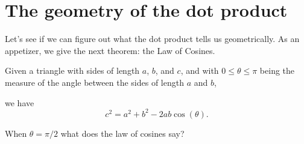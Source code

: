 \documentclass{ximera}
\begin{document}
\section{The geometry of the dot product}

Let's see if we can figure out what the dot product tells us geometrically. As
an appetizer, we give the next theorem: the Law of Cosines.

\begin{theorem}
  Given a triangle with sides of length $a$, $b$, and $c$, and with
  $0\le\theta\le\pi$ being the measure of the angle between the sides
  of length $a$ and $b$,
  \begin{image}
  \end{image}
  we have
  \[
  c^2 = a^2+b^2-2ab\cos(\theta).
  \]
\end{theorem}
\begin{question}
  When $\theta = \pi/2$ what does the law of cosines say?
  \begin{prompt}
    \begin{multipleChoice}
    \end{multipleChoice}
  \end{prompt}
\end{question}
\end{document}
